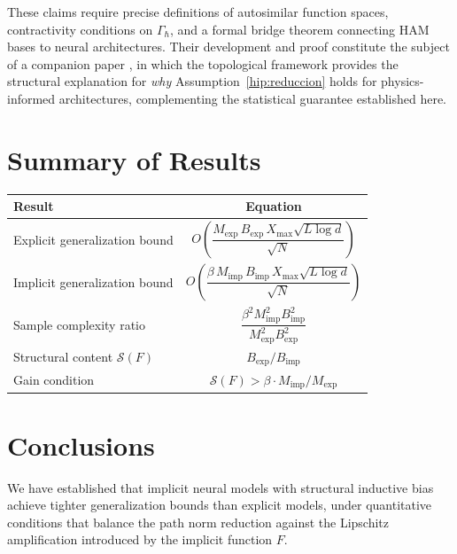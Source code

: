 \documentclass[12pt]{article}
\begin{document}
These claims require precise definitions of autosimilar function
spaces, contractivity conditions on $\Gamma_\hbar$, and a formal
bridge theorem connecting HAM bases to neural architectures.
Their development and proof constitute the subject of a companion
paper \cite{Rodrigo2026companion}, in which the topological
framework provides the structural explanation for \emph{why}
Assumption~\ref{hip:reduccion} holds for physics-informed
architectures, complementing the statistical guarantee established
here.

\section{Summary of Results}
\label{sec:summary}

\begin{center}
\renewcommand{\arraystretch}{1.5}
\begin{tabular}{lc}
  \toprule
  \textbf{Result} & \textbf{Equation} \\
  \midrule
  Explicit generalization bound &
  $O\!\left(\dfrac{M_{\mathrm{exp}}\, B_{\mathrm{exp}}\, X_{\max}
    \sqrt{L\log d}}{\sqrt{N}}\right)$ \\[8pt]
  Implicit generalization bound &
  $O\!\left(\dfrac{\beta\, M_{\mathrm{imp}}\, B_{\mathrm{imp}}\,
    X_{\max} \sqrt{L\log d}}{\sqrt{N}}\right)$ \\[8pt]
  Sample complexity ratio &
  $\dfrac{\beta^2 M_{\mathrm{imp}}^2 B_{\mathrm{imp}}^2}
    {M_{\mathrm{exp}}^2 B_{\mathrm{exp}}^2}$ \\[8pt]
  Structural content $\mathcal{S}(F)$ &
  $B_{\mathrm{exp}} / B_{\mathrm{imp}}$ \\[4pt]
  Gain condition &
  $\mathcal{S}(F) > \beta \cdot M_{\mathrm{imp}} / M_{\mathrm{exp}}$
  \\
  \bottomrule
\end{tabular}
\end{center}

\section{Conclusions}
\label{sec:conclusions}

We have established that implicit neural models with structural
inductive bias achieve tighter generalization bounds than explicit
models, under quantitative conditions that balance the path norm
reduction against the Lipschitz amplification introduced by the
implicit function $F$.
\end{document}
